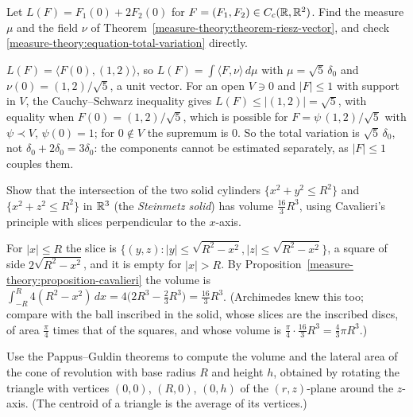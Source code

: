 \begin{exercise}\label{measure-theory:exercise-total-variation-point}
Let $L(F) = F_1(0) + 2F_2(0)$ for $F = (F_1, F_2) \in C_c(\mathbb{R}, \mathbb{R}^2)$. Find the measure $\mu$ and the field $\nu$ of Theorem~\ref{measure-theory:theorem-riesz-vector}, and check
\eqref{measure-theory:equation-total-variation} directly.
\end{exercise}

\begin{solution}
$L(F) = \langle F(0), (1, 2)\rangle$, so $L(F) = \int\langle F, \nu\rangle\,d\mu$ with $\mu = \sqrt5\,\delta_0$ and $\nu(0) = (1, 2)/\sqrt5$, a unit vector. For an open $V \ni 0$ and $|F| \leq 1$ with
support in $V$, the Cauchy--Schwarz inequality gives $L(F) \leq |(1, 2)| = \sqrt5$, with equality when $F(0) = (1, 2)/\sqrt5$, which is possible for $F = \psi\,(1, 2)/\sqrt5$ with $\psi \prec V$, $\psi(0) = 1$; for
$0 \notin V$ the supremum is $0$. So the total variation is $\sqrt5\,\delta_0$, not $\delta_0 + 2\delta_0 = 3\delta_0$: the components cannot be estimated separately, as $|F| \leq 1$ couples them.
\end{solution}

\begin{exercise}\label{measure-theory:exercise-steinmetz}
Show that the intersection of the two solid cylinders $\{x^2 + y^2 \leq R^2\}$ and $\{x^2 + z^2 \leq R^2\}$ in $\mathbb{R}^3$ (the \emph{Steinmetz solid}) has volume $\frac{16}{3}R^3$, using Cavalieri's principle with
slices perpendicular to the $x$-axis.
\end{exercise}

\begin{solution}
For $|x| \leq R$ the slice is $\{(y, z) : |y| \leq \sqrt{R^2 - x^2}, |z| \leq \sqrt{R^2 - x^2}\}$, a square of side $2\sqrt{R^2 - x^2}$, and it is empty for $|x| > R$. By
Proposition~\ref{measure-theory:proposition-cavalieri} the volume is $\int_{-R}^R4(R^2 - x^2)\,dx = 4\bigl(2R^3 - \frac23R^3\bigr) = \frac{16}{3}R^3$. (Archimedes knew this too; compare with the ball inscribed in the
solid, whose slices are the inscribed discs, of area $\frac\pi4$ times that of the squares, and whose volume is $\frac\pi4 \cdot \frac{16}{3}R^3 = \frac43\pi R^3$.)
\end{solution}

\begin{exercise}\label{measure-theory:exercise-pappus-cone}
Use the Pappus--Guldin theorems to compute the volume and the lateral area of the cone of revolution with base radius $R$ and height $h$, obtained by rotating the triangle with vertices $(0, 0)$, $(R, 0)$,
$(0, h)$ of the $(r, z)$-plane around the $z$-axis. (The centroid of a triangle is the average of its vertices.)
\end{exercise}

